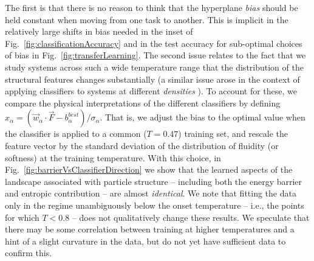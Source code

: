 \documentclass[aps,reprint,superscriptaddress,nofootinbib, notitlepage,prl]{revtex4-2}
\begin{document}
The first is that there is no reason to think that the hyperplane \emph{bias} should be held constant when moving from one task to another. This is implicit in the relatively large shifts in bias needed in the inset of  Fig.~\ref{fig:classificationAccuracy} and in the test accuracy for sub-optimal choices of bias in Fig.~\ref{fig:transferLearning}. The second issue relates to the fact that  we study systems across such a wide temperature range that the distribution of the structural features changes substantially (a similar issue arose in the context of applying classifiers to systems at different \emph{densities} \cite{tah2022fragility}). To account for these, we compare the physical interpretations of the different classifiers by defining 
$x_\alpha = \left(\vec{w}_\alpha\cdot \vec{F} -b_\alpha^{best}\right)/ \sigma_\alpha$.
That is, we  adjust the bias to the optimal value when the classifier is applied to a common ($T=0.47$)  training set, and rescale the feature vector by the standard deviation of the distribution of fluidity (or softness) at the training temperature. With this choice, in Fig.~\ref{fig:barrierVsClassifierDirection} we show that the learned aspects of the landscape associated with particle structure -- including both the energy barrier and entropic contribution -- are almost \emph{identical}. We note that fitting the data only in the regime unambiguously below the onset temperature -- i.e., the points for which $T<0.8$ -- does not qualitatively change these results. We speculate that there may be some correlation between training at higher temperatures and a hint of a slight curvature in the data, but do not yet have sufficient data to confirm this.

\end{document}
